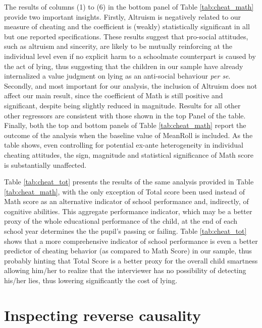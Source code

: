 \documentclass[authoryear, preprint, review, 12pt]{elsarticle}
\begin{document}
The results of columns (1) to (6) in the bottom panel of Table \ref{tab:cheat_math} provide two important insights. Firstly, Altruism is negatively related to our measure of cheating and the coefficient is (weakly) statistically significant in all but one reported specifications. These results suggest that pro-social attitudes, such as altruism and sincerity, are likely to be mutually reinforcing at the individual level even if no explicit harm to a schoolmate counterpart is caused by the act of lying, thus suggesting that the children in our sample have already internalized a value judgment on lying as an anti-social behaviour \textit{per se}. Secondly, and most important for our analysis, the inclusion of Altruism does not affect our main result, since the coefficient of Math is still positive and significant, despite being slightly reduced in magnitude. Results for all other other regressors are consistent with those shown in the top Panel of the table. Finally, both the top and bottom panels of Table \ref{tab:cheat_math} report the outcome of the analysis when the baseline value of MeanRoll is included. As the table shows, even controlling for potential ex-ante heterogeneity in individual cheating attitudes, the sign, magnitude and statistical significance of Math score is substantially unaffected.

Table \ref{tab:cheat_tot} presents the results of the same analysis provided in Table \ref{tab:cheat_math}, with the only exception of Total score been used instead of Math score as an alternative indicator of school performance and, indirectly, of cognitive abilities. This aggregate performance indicator, which may be a better proxy of the whole educational performance of the child, at the end of each school year determines the the pupil's passing or failing. Table \ref{tab:cheat_tot} shows that a more comprehensive indicator of school performance is even a better predictor of cheating behavior (as compared to Math Score) in our sample, thus probably hinting that Total Score is a better proxy for the overall child smartness allowing him/her to realize that the interviewer has no possibility of detecting his/her lies, thus lowering significantly the cost of lying.



\section{Inspecting reverse causality}
\label{sec:revcause}
\end{document}
